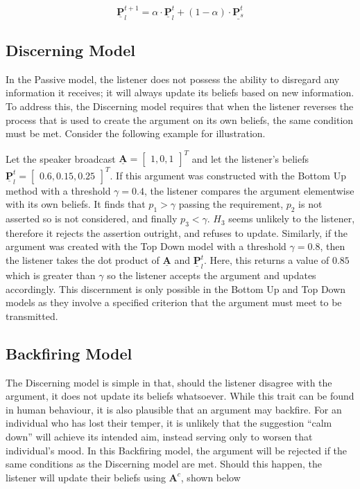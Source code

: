 \begin{equation} 
    \underline{\mathbf{P}}^{t+1}_l = \alpha \cdot \underline{\mathbf{P}}^{t}_l + (1 - \alpha) \cdot \underline{\mathbf{P}_s^t} 
\end{equation}


\subsection*{Discerning Model}

In the Passive model, the listener does not possess the ability to disregard any information it receives; it will always update its beliefs based on new information. To address this, the Discerning model requires that when the listener reverses the process that is used to create the argument on its own beliefs, the same condition must be met. Consider the following example for illustration. 

Let the speaker broadcast $\underline{\mathbf{A}} = \begin{bmatrix}
    1,
    0,
    1
\end{bmatrix}^T$
and let the listener's beliefs
$\underline{\mathbf{P}}^t_l = \begin{bmatrix}
    0.6,
    0.15,
    0.25
\end{bmatrix}^T$. If this argument was constructed with the Bottom Up method with a threshold $\gamma = 0.4$, the listener compares the argument elementwise with its own beliefs. It finds that $p_1 > \gamma$ passing the requirement, $p_2$ is not asserted so is not considered, and finally $p_3 < \gamma$. $H_3$ seems unlikely to the listener, therefore it rejects the assertion outright, and refuses to update. Similarly, if the argument was created with the Top Down model with a threshold $\gamma = 0.8$, then the listener takes the dot product of $\underline{\mathbf{A}}$ and $\underline{\mathbf{P}}_l^t$. Here, this returns a value of $0.85$ which is greater than $\gamma$ so the listener accepts the argument and updates accordingly. This discernment is only possible in the Bottom Up and Top Down models as they involve a specified criterion that the argument must meet to be transmitted.


\subsection*{Backfiring Model}

The Discerning model is simple in that, should the listener disagree with the argument, it does not update its beliefs whatsoever. While this trait can be found in human behaviour, it is also plausible that an argument may backfire. For an individual who has lost their temper, it is unlikely that the suggestion ``calm down'' will achieve its intended aim, instead serving only to worsen that individual's mood. In this Backfiring model, the argument will be rejected if the same conditions as the Discerning model are met. Should this happen, the listener will update their beliefs using $\mathbf{A}^c$, shown below

